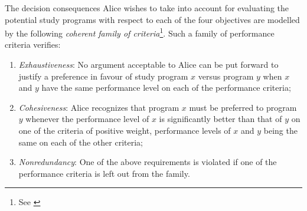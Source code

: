 The decision consequences Alice wishes to take into account for evaluating the potential study programs with respect to each of the four objectives are modelled by the following \emph{coherent family of criteria}\footnote{See \citet{ROY-2000}}. Such a family of performance criteria verifies:
\begin{enumerate}
\item \emph{Exhaustiveness}: No argument acceptable to Alice can be put forward to justify a preference in favour of study program $x$ versus program $y$  when $x$ and $y$ have the same performance level on each of the performance criteria;
\item \emph{Cohesiveness}: Alice recognizes that program $x$ must be preferred to program $y$ whenever the performance level of $x$ is significantly better than that of $y$ on one of the criteria of positive weight, performance levels of $x$ and $y$ being the same on each of the other criteria; 
\item \emph{Nonredundancy}: One of the above requirements is violated if one of the performance criteria is left out from the family.
\end{enumerate}
